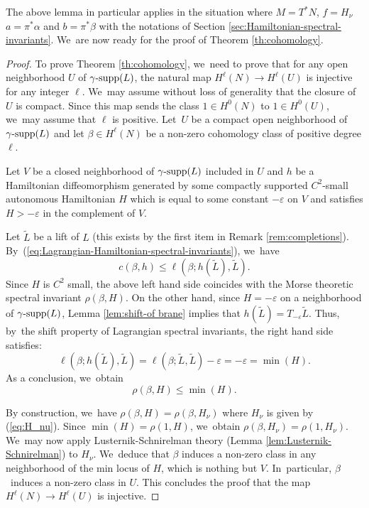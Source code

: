 \documentclass[JEP,XML,SOM,Unicode,NoFloatCountersInSection,published]{cedram}
\theoremstyle{definition}
\DeclareMathOperator{\gammasupp}{\gamma\textup{-supp}}
\begin{document}
The above lemma in particular applies in the situation where $M=T^*N$, $f=H_\nu$ $a=\pi^*\alpha$ and $b=\pi^*\beta$ with the notations of Section \ref{sec:Hamiltonian-spectral-invariants}. We~are now ready for the proof of Theorem \ref{th:cohomology}.

\begin{proof} To prove Theorem \ref{th:cohomology}, we~need to prove that for any open neighborhood $U$ of $\gammasupp(L)$, the natural map $H^\ell(N)\to H^\ell(U)$ is injective for any integer $\ell$. We~may assume without loss of generality that the closure of $U$ is compact. Since this map sends the class $1\in H^0(N)$ to $1\in H^0(U)$, we~may assume that $\ell$ is positive.
Let~$U$ be a compact open neighborhood of $\gammasupp(L)$ and let $\beta\in H^\ell(N)$ be a non-zero cohomology class of positive degree $\ell$.

Let $V$ be a closed neighborhood of $\gammasupp(L)$ included in $U$ and $h$ be a Hamiltonian diffeomorphism generated by some compactly supported $C^2$-small autonomous Hamiltonian $H$ which is equal to some constant $-\varepsilon$ on $V$ and satisfies $H>-\varepsilon$ in the complement of $V$.

Let $\tilde L$ be a lift of $L$ (this exists by the first item in Remark
\ref{rem:completions}). By~(\ref{eq:Lagrangian-Hamiltonian-spectral-invariants}), we~have
\[
c(\beta, h)\leq \ell(\beta; h(\tilde L),\tilde L).
\]
Since $H$ is $C^2$ small, the above left hand side coincides with the Morse theoretic spectral invariant $\rho(\beta, H)$. On the other hand, since $H=-\varepsilon$ on a neighborhood of $\gammasupp (L)$, Lemma \ref{lem:shift-of brane} implies that $h(\tilde L)=T_{-\varepsilon}\tilde L$. Thus, by~the shift property of Lagrangian spectral invariants, the right hand side satisfies:
\[
\ell(\beta; h(\tilde L),\tilde L)=\ell(\beta; \tilde L,\tilde L)-\varepsilon=-\varepsilon=\min(H).
\]
As a conclusion, we~obtain
\[
\rho(\beta, H)\leq\min(H).
\]

By construction, we~have $\rho(\beta, H)=\rho(\beta, H_\nu)$ where $H_\nu$ is given by (\ref{eq:H_nu}). Since $\min(H)=\rho(1,H)$, we~obtain $\rho(\beta, H_\nu)=\rho(1, H_\nu)$. We~may now apply Lusternik-Schnirelman theory (Lemma \ref{lem:Lusternik-Schnirelman}) to $H_\nu$. We~deduce that $\beta$ induces a non-zero class in any neighborhood of the min locus of $H$, which is nothing but $V$. In~particular, $\beta$~induces a non-zero class in $U$. This concludes the proof that the map \hbox{$H^\ell(N)\!\to\! H^\ell(U)$} is injective.
\end{proof}
\end{document}
